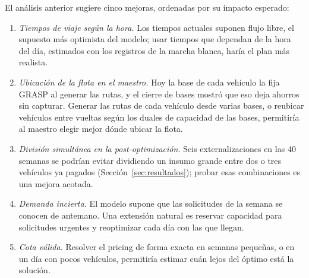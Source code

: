 El análisis anterior sugiere cinco mejoras, ordenadas por su impacto esperado:
\begin{enumerate}\itemsep0pt
\item \emph{Tiempos de viaje según la hora.} Los tiempos actuales suponen flujo libre, el supuesto más optimista del modelo; usar tiempos que dependan de la hora del día, estimados con los registros de la marcha blanca, haría el plan más realista.
\item \emph{Ubicación de la flota en el maestro.} Hoy la base de cada vehículo la fija GRASP al generar las rutas, y el cierre de bases mostró que eso deja ahorros sin capturar. Generar las rutas de cada vehículo desde varias bases, o reubicar vehículos entre vueltas según los duales de capacidad de las bases, permitiría al maestro elegir mejor dónde ubicar la flota.
\item \emph{División simultánea en la post-optimización.} Seis externalizaciones en las 40 semanas se podrían evitar dividiendo un insumo grande entre dos o tres vehículos ya pagados (Sección~\ref{sec:resultados}); probar esas combinaciones es una mejora acotada.
\item \emph{Demanda incierta.} El modelo supone que las solicitudes de la semana se conocen de antemano. Una extensión natural es reservar capacidad para solicitudes urgentes y reoptimizar cada día con las que llegan.
\item \emph{Cota válida.} Resolver el pricing de forma exacta en semanas pequeñas, o en un día con pocos vehículos, permitiría estimar cuán lejos del óptimo está la solución.
\end{enumerate}
